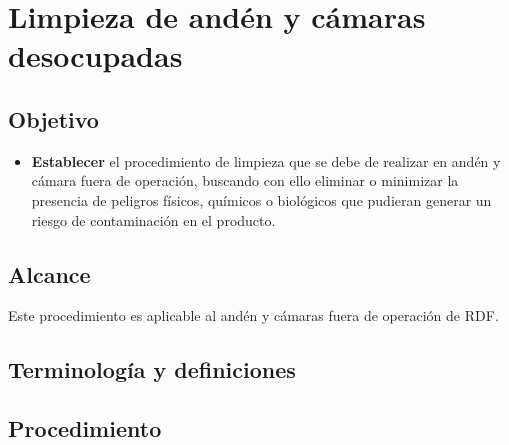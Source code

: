 \thispagestyle{formato-PI}
\renewcommand{\MayorVer}{2}
\renewcommand{\MenorVer}{0}
\renewcommand{\Titulo}{Limpieza de andén y cámaras desocupadas}
\renewcommand{\Codigo}{HYS-3-IT}
\renewcommand{\FechaPub}{2023--01}

\section{\Titulo}

\subsection{Objetivo}
\begin{itemize}
	\item \textbf{Establecer} el procedimiento de limpieza que se debe de realizar en andén y cámara fuera de operación, buscando con ello eliminar o minimizar la presencia de peligros físicos, químicos o biológicos que pudieran generar un riesgo de contaminación en el producto.
\end{itemize}

\subsection{Alcance}
Este procedimiento es aplicable al andén y cámaras fuera de operación de \gls{RDF}.

\subsection{Terminología y definiciones}

\begin{description}
\end{description}


\subsection{Procedimiento}
